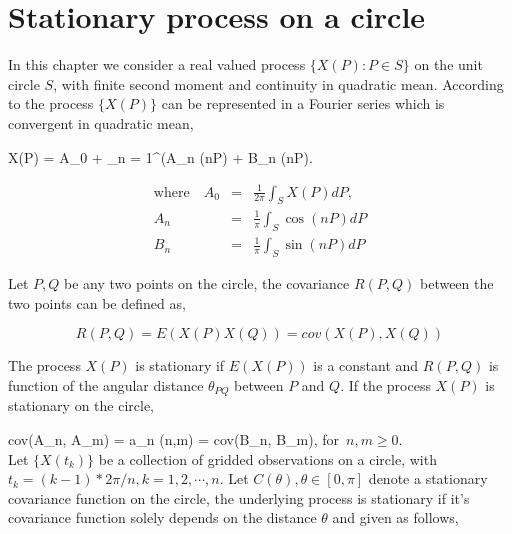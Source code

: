 
\section{Stationary process on a circle}

In this chapter we consider a real valued process $\{X(P): P\in S\}$ on the unit circle $S$, with finite second moment and continuity in quadratic mean. According to \cite{DUFOUR1976107} the process $\{X(P)\}$ can be represented in a Fourier series which is convergent in quadratic mean,

\beq \label{process_circle}
X(P) = A_0 + \sum_{n = 1}^\infty (A_n \cos(nP) + B_n \sin(nP).
\eeq


\begin{eqnarray}
	\nonumber
	\mbox{where} \quad A_0 &=&  \frac{1}{2\pi} \int_S X(P)dP, \\ \nonumber
	A_n &=& \frac{1}{\pi} \int_S \cos(nP)dP \\ 
	B_n &=& \frac{1}{\pi} \int_S \sin(nP)dP 
\end{eqnarray}

Let $P,Q$ be any two points on the circle, the covariance $R(P,Q)$ between the two points can be defined as,

\[
	R(P,Q) = E(X(P)X(Q)) = cov(X(P), X(Q))
\]

The process $X(P)$ is stationary if $E(X(P))$ is a constant and $R(P,Q)$ is function of the angular distance $\theta_{PQ}$ between $P$ and $Q$. If the process $X(P)$ is stationary on the circle,

\beq
cov(A_n, A_m) = a_n \delta(n,m) = cov(B_n, B_m), \quad \mbox{for $n, m \ge 0$}.
\eeq\\


Let $\{X(t_k)\}$ be a collection of gridded observations on a circle, with $t_k = (k-1)*2\pi/n, k = 1, 2, \cdots, n$. Let $C(\theta), \theta \in [0, \pi ]$ denote a stationary covariance function on the circle, the underlying process is stationary if it's covariance function solely depends on the distance $\theta$ and given as follows,

